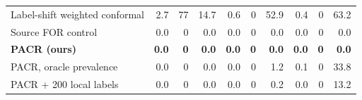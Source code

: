 \begin{table}[!htbp]
\begin{tabular}{@{}lrrrrrrrrr@{}}
\quad Label-shift weighted conformal & 2.7 & 77 & 14.7 & 0.6 & 0 & 52.9 & 0.4 & 0 & 63.2 \\
\quad Source FOR control & 0.0 & 0 & 0.0 & 0.0 & 0 & 0.0 & 0.0 & 0 & 0.0 \\
\quad \textbf{PACR (ours)} & \textbf{0.0} & \textbf{0} & \textbf{0.0} & \textbf{0.0} & \textbf{0} & \textbf{0.0} & \textbf{0.0} & \textbf{0} & \textbf{0.0} \\
\quad PACR, oracle prevalence & 0.0 & 0 & 0.0 & 0.0 & 0 & 1.2 & 0.1 & 0 & 33.8 \\
\quad PACR + 200 local labels & 0.0 & 0 & 0.0 & 0.0 & 0 & 0.2 & 0.0 & 0 & 13.2 \\
\bottomrule
\end{tabular}
\end{table}
